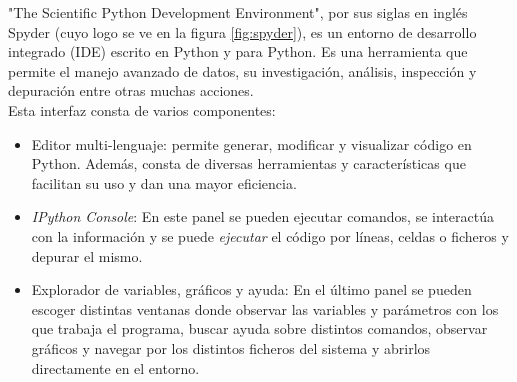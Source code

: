 "The Scientific Python Development Environment", por sus siglas en inglés Spyder (cuyo logo se ve en la figura \ref{fig:spyder}), es un entorno de desarrollo integrado (IDE) escrito en Python y para Python. Es una herramienta que permite el manejo avanzado de datos, su investigación, análisis, inspección y depuración entre otras muchas acciones. \cite{IPythonC75:online} \\

Esta interfaz consta de varios componentes: 
\begin{itemize}
	\item Editor multi-lenguaje: permite generar, modificar y visualizar código en Python. Además, consta de diversas herramientas y características que facilitan su uso y dan una mayor eficiencia.
	\item \textit{IPython Console}: En este panel se pueden ejecutar comandos, se interactúa con la información y se puede \textit{ejecutar} el código por líneas, celdas o ficheros y depurar el mismo.
	\item Explorador de variables, gráficos y ayuda: En el último panel se pueden escoger distintas ventanas donde observar las variables y parámetros con los que trabaja el programa, buscar ayuda sobre distintos comandos, observar gráficos y navegar por los distintos ficheros del sistema y abrirlos directamente en el entorno.
\end{itemize}

